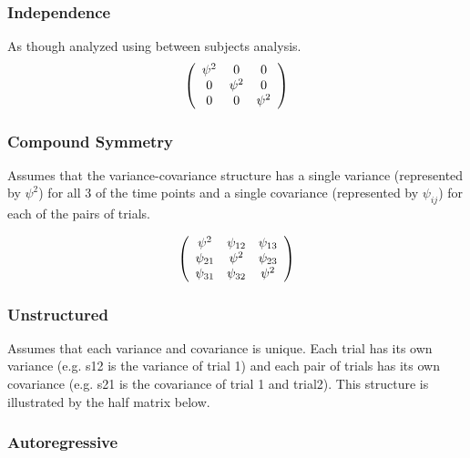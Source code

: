 \documentclass[12pt, a4paper]{report}
\theoremstyle{plain}
\theoremstyle{definition}
\theoremstyle{remark}
\begin{document}
	

		\subsubsection*{Independence}
		
		As though analyzed using between subjects analysis.
		\[
		\left(
		\begin{array}{c c c}
		\psi^2 & 0 & 0   \\
		0 & \psi^2 & 0   \\
		0 & 0 & \psi^2   \\
		\end{array}%
		\right)
		\]	

			
	\subsubsection*{Compound Symmetry}
	
	Assumes that the variance-covariance structure has a single variance (represented by $\psi^2$)
	for all 3 of the time points and a single covariance (represented by $\psi_{ij}$) for each of the pairs of trials.
	
	\[
	\left(%
	\begin{array}{c c c}
	\psi^2 &  \psi_{12} & \psi_{13}   \\
	\psi_{21} & \psi^2 & \psi_{23}   \\
	\psi_{31} & \psi_{32} & \psi^2   \\
	\end{array}%
	\right)
	\]
		

		
		
		\subsubsection{Unstructured}
		
		Assumes that each variance and covariance is unique.
		Each trial has its own variance (e.g. s12 is the variance of trial 1)
		and each pair of trials has its own covariance (e.g. s21 is the covariance of trial 1 and trial2).
		This structure is illustrated by the half matrix below.
		
\subsubsection{Autoregressive}
		
\end{document}
